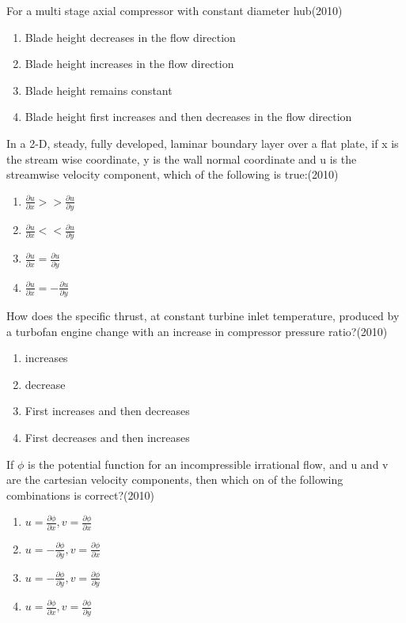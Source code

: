  \item For a multi stage axial compressor with constant diameter hub\hfill (2010)
 \begin{enumerate}[label=(\Alph*)]
    \item Blade height decreases in the flow direction
    \item Blade height increases in the flow direction
    \item Blade height remains constant
    \item Blade height first increases and then decreases in the flow direction
 \end{enumerate}
 \item In a 2-D, steady, fully developed, laminar boundary layer over a flat plate, if x is the stream wise coordinate, y is the wall normal coordinate and u is the streamwise velocity component, which of the following is true:\hfill (2010)
 \begin{enumerate}[label=(\Alph*)]
    \item $\frac{\partial u}{\partial x}>>\frac{\partial u}{\partial y}$
    \item $\frac{\partial u}{\partial x}<<\frac{\partial u}{\partial y}$
    \item $\frac{\partial u}{\partial x}=\frac{\partial u}{\partial y}$
    \item $\frac{\partial u}{\partial x}=-\frac{\partial u}{\partial y}$
 \end{enumerate}
 \item How does the specific thrust, at constant turbine inlet temperature, produced by a turbofan engine change with an increase in compressor pressure ratio?\hfill (2010)
 \begin{enumerate}[label=(\Alph*)]
    \item increases
    \item decrease
    \item First increases and then decreases
    \item First decreases and then increases
 \end{enumerate}
 \item If $\phi$ is the potential function for an incompressible irrational flow, and u and v are the cartesian velocity components, then which on of the following combinations is correct?\hfill (2010)
 \begin{enumerate}[label=(\Alph*)]
    \item $u=\frac{\partial \phi}{\partial x}, v=\frac{\partial \phi}{\partial x}$
    \item $u=- \frac{\partial \phi}{\partial y}, v=\frac{\partial \phi}{\partial x}$
    \item $u=- \frac{\partial \phi}{\partial y}, v=\frac{\partial \phi}{\partial y}$
    \item $u=\frac{\partial \phi}{\partial x}, v=\frac{\partial \phi}{\partial y}$
 \end{enumerate}
